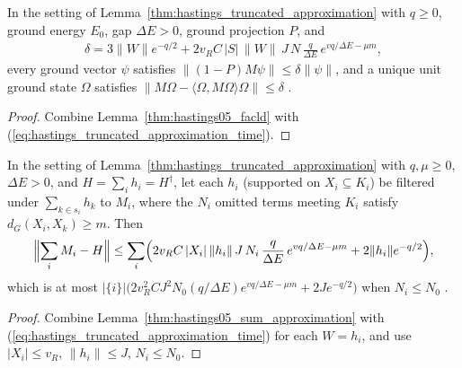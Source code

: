 \begin{lemma}
    \label{thm:hastings_truncated_facld}
    \leanok
    In the setting of Lemma~\ref{thm:hastings_truncated_approximation} with
    $q\ge0$, ground energy $E_0$, gap $\Delta E>0$, ground projection $P$, and
    \begin{align}
        \delta=3\|W\|e^{-q/2}+2v_RC\,|S|\,\|W\|\,J\,N\,\frac{q}{\Delta E}\,
        e^{vq/\Delta E-\mu m},
        \label{eq:hastings_truncated_facld_delta}
    \end{align}
    every ground vector $\psi$ satisfies $\|(1-P)M\psi\|\le\delta\|\psi\|$, and
    a unique unit ground state $\Omega$ satisfies
    $\|M\Omega-\langle\Omega,M\Omega\rangle\Omega\|\le\delta$
    \cite[eq.~(facld), lines 322--348 and 375--387]{Hastings2006Solving}.
\end{lemma}
\begin{proof}
    \leanok
    Combine Lemma~\ref{thm:hastings05_facld} with
    (\ref{eq:hastings_truncated_approximation_time}).
\end{proof}

\begin{lemma}
    \label{thm:hastings_truncated_sum}
    \leanok
    In the setting of Lemma~\ref{thm:hastings_truncated_approximation} with
    $q,\mu\ge0$, $\Delta E>0$, and $H=\sum_ih_i=H^\dagger$, let each $h_i$
    (supported on $X_i\subseteq K_i$) be filtered under $\sum_{k\in s_i}h_k$ to
    $M_i$, where the $N_i$ omitted terms meeting $K_i$ satisfy
    $d_G(X_i,X_k)\ge m$. Then
    \begin{align}
        \Bigl\|\sum_iM_i-H\Bigr\|\le\sum_i\Bigl(2v_RC\,|X_i|\,\|h_i\|\,J\,N_i\,
        \frac{q}{\Delta E}\,e^{vq/\Delta E-\mu m}+2\|h_i\|e^{-q/2}\Bigr),
        \label{eq:hastings_truncated_sum}
    \end{align}
    which is at most $|\{i\}|\bigl(2v_R^2CJ^2N_0(q/\Delta E)e^{vq/\Delta E-\mu m}+2Je^{-q/2}\bigr)$
    when $N_i\le N_0$ \cite[lines 343--374]{Hastings2006Solving}.
\end{lemma}
\begin{proof}
    \leanok
    Combine Lemma~\ref{thm:hastings05_sum_approximation} with
    (\ref{eq:hastings_truncated_approximation_time}) for each $W=h_i$, and use
    $|X_i|\le v_R$, $\|h_i\|\le J$, $N_i\le N_0$.
\end{proof}

